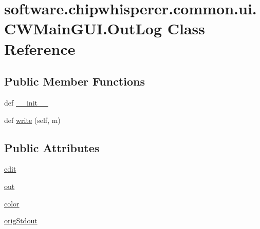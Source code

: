 \hypertarget{classsoftware_1_1chipwhisperer_1_1common_1_1ui_1_1CWMainGUI_1_1OutLog}{}\section{software.\+chipwhisperer.\+common.\+ui.\+C\+W\+Main\+G\+U\+I.\+Out\+Log Class Reference}
\label{classsoftware_1_1chipwhisperer_1_1common_1_1ui_1_1CWMainGUI_1_1OutLog}
\subsection*{Public Member Functions}
\begin{DoxyCompactItemize}
\item 
def \hyperlink{classsoftware_1_1chipwhisperer_1_1common_1_1ui_1_1CWMainGUI_1_1OutLog_a8b7818709cfe869a3d6fd530aa44ce20}{\+\_\+\+\_\+init\+\_\+\+\_\+}
\item 
def \hyperlink{classsoftware_1_1chipwhisperer_1_1common_1_1ui_1_1CWMainGUI_1_1OutLog_a9ce9fbfa97b20e49bf86854060e8cdfc}{write} (self, m)
\end{DoxyCompactItemize}
\subsection*{Public Attributes}
\begin{DoxyCompactItemize}
\item 
\hyperlink{classsoftware_1_1chipwhisperer_1_1common_1_1ui_1_1CWMainGUI_1_1OutLog_a446c7961ef5ae7b88e52d0fe18184e0d}{edit}
\item 
\hyperlink{classsoftware_1_1chipwhisperer_1_1common_1_1ui_1_1CWMainGUI_1_1OutLog_a74d31e7b8063bd62bff3aafa515f39ff}{out}
\item 
\hyperlink{classsoftware_1_1chipwhisperer_1_1common_1_1ui_1_1CWMainGUI_1_1OutLog_a1afed4aff3a7765b8d8609cff5556d55}{color}
\item 
\hyperlink{classsoftware_1_1chipwhisperer_1_1common_1_1ui_1_1CWMainGUI_1_1OutLog_a5b854f0c7fb8f98692a348b3055f7078}{orig\+Stdout}
\end{DoxyCompactItemize}


